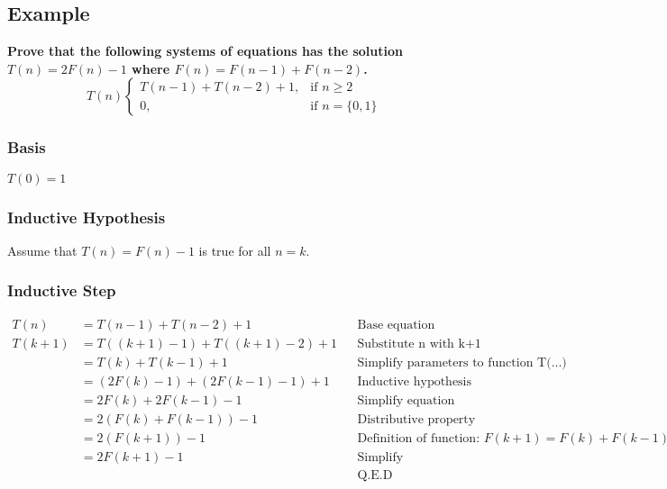 \newpage

\subsection{Example}
\textbf{Prove that the following systems of equations has the solution $T(n) = 2F(n) - 1$ where $F(n) = F(n-1) + F(n-2)$.}
$$
T(n) \begin{cases}
T(n-1) + T(n-2) + 1, & \mbox{if } n \geq 2\\
0, & \mbox{if } n = \{0,1\}
\end{cases}
$$

\subsubsection*{Basis}
$T(0) = 1$

\subsubsection*{Inductive Hypothesis}
Assume that $T(n) = F(n) - 1$ is true for all $n = k$.

\subsubsection*{Inductive Step}
\begin{align*}
	T(n) 	&= T(n-1) + T(n-2) + 1					&& \text{Base equation}\\
	T(k+1) 	&= T((k+1) - 1) + T((k+1) - 2) + 1 		&& \text{Substitute n with k+1}\\
			&= T(k) + T(k-1) + 1					&& \text{Simplify parameters to function T(...)}\\
			&= (2F(k) - 1) + (2F(k-1) - 1) + 1		&& \text{Inductive hypothesis}\\
			&= 2F(k) + 2F(k-1) - 1					&& \text{Simplify equation}\\
			&= 2(F(k) + F(k-1)) - 1					&& \text{Distributive property}\\
			&= 2(F(k+1)) - 1						&& \text{Definition of function: } F(k+1) = F(k) + F(k-1)\\
			&= 2F(k+1) - 1							&& \text{Simplify}\\
			&										&& \text{Q.E.D}
\end{align*}